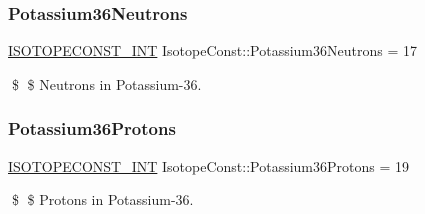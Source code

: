 \subsubsection{\texorpdfstring{Potassium36\+Neutrons}{Potassium36Neutrons}}
{\footnotesize\ttfamily \mbox{\hyperlink{group___isotope_const-_macros_ga5f18360b3e99483a35c32d789e62621c}{I\+S\+O\+T\+O\+P\+E\+C\+O\+N\+S\+T\+\_\+\+I\+NT}} Isotope\+Const\+::\+Potassium36\+Neutrons = 17}

\$ \$ Neutrons in Potassium-\/36. \mbox{\label{group___isotope_const-_potassium-_k36_gafecb4fce7cc9ac2e2846ff29aef874d7}} 
\subsubsection{\texorpdfstring{Potassium36\+Protons}{Potassium36Protons}}
{\footnotesize\ttfamily \mbox{\hyperlink{group___isotope_const-_macros_ga5f18360b3e99483a35c32d789e62621c}{I\+S\+O\+T\+O\+P\+E\+C\+O\+N\+S\+T\+\_\+\+I\+NT}} Isotope\+Const\+::\+Potassium36\+Protons = 19}

\$ \$ Protons in Potassium-\/36. 